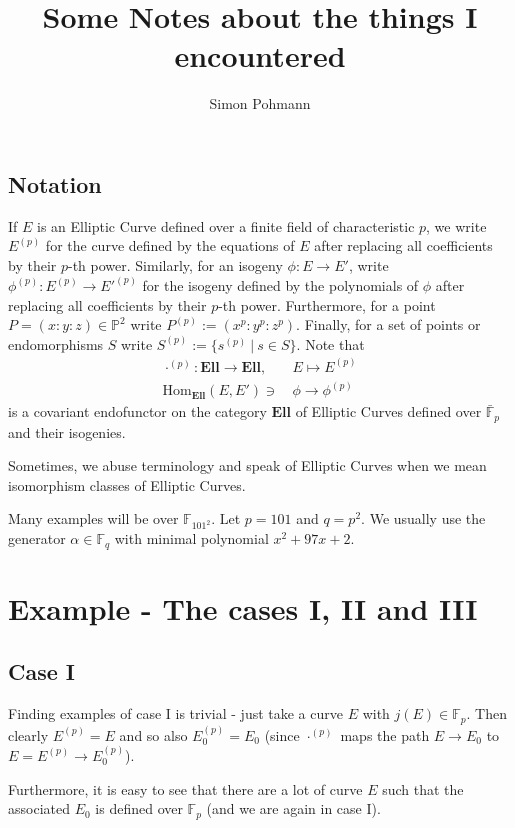 \documentclass{scrartcl}
\title{Some Notes about the things I encountered}
\author{Simon Pohmann}
\newcommand{\F}{\mathbb{F}}
\theoremstyle{definition}
\begin{document}
\maketitle

\subsection*{Notation}
If $E$ is an Elliptic Curve defined over a finite field of characteristic $p$, we write $E^{(p)}$ for the curve defined by the equations of $E$ after replacing all coefficients by their $p$-th power.
Similarly, for an isogeny $\phi: E \to E'$, write $\phi^{(p)}: E^{(p)} \to E'^{(p)}$ for the isogeny defined by the polynomials of $\phi$ after replacing all coefficients by their $p$-th power.
Furthermore, for a point $P = (x : y : z) \in \mathbb{P}^2$ write $P^{(p)} := (x^p : y^p : z^p)$.
Finally, for a set of points or endomorphisms $S$ write $S^{(p)} := \{ s^{(p)} \ | \ s \in S \}$.
Note that
\begin{align*}
    \cdot^{(p)}: \mathrm{\textbf{Ell}} \to \mathrm{\textbf{Ell}}, \quad &E \mapsto E^{(p)} \\
    \mathrm{Hom}_{\mathrm{\textbf{Ell}}}(E, E') \ni &\phi \to \phi^{(p)}
\end{align*}
is a covariant endofunctor on the category $\mathrm{\textbf{Ell}}$ of Elliptic Curves defined over $\bar{\F}_p$ and their isogenies.

Sometimes, we abuse terminology and speak of Elliptic Curves when we mean isomorphism classes of Elliptic Curves.

Many examples will be over $\F_{101^2}$.
Let $p = 101$ and $q = p^2$.
We usually use the generator $\alpha \in \F_q$ with minimal polynomial $x^2 + 97 x + 2$.

\section{Example - The cases I, II and III}
\subsection{Case I}
Finding examples of case I is trivial - just take a curve $E$ with $j(E) \in \F_p$.
Then clearly $E^{(p)} = E$ and so also $E_0^{(p)} = E_0$ (since $\cdot^{(p)}$ maps the path $E \to E_0$ to $E = E^{(p)} \to E_0^{(p)}$).

Furthermore, it is easy to see that there are a lot of curve $E$ such that the associated $E_0$ is defined over $\F_p$ (and we are again in case I).
\end{document}
